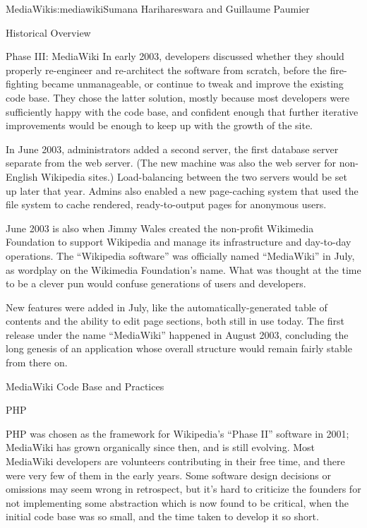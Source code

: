 \begin{aosachapter}{MediaWiki}{s:mediawiki}{Sumana Harihareswara and Guillaume Paumier}
\begin{aosasect1}{Historical Overview}
\begin{aosasect2}{Phase III: MediaWiki}
In early 2003, developers discussed whether they should properly
re-engineer and re-architect the software from scratch, before the
fire-fighting became unmanageable, or continue to tweak and improve
the existing code base. They chose the latter solution, mostly because
most developers were sufficiently happy with the code base, and
confident enough that further iterative improvements would be enough
to keep up with the growth of the site.

In June 2003, administrators added a second server, the first database
server separate from the web server. (The new machine was also the web
server for non-English Wikipedia sites.) Load-balancing between the
two servers would be set up later that year. Admins also enabled a new
page-caching system that used the file system to cache rendered,
ready-to-output pages for anonymous users.

June 2003 is also when Jimmy Wales created the non-profit Wikimedia 
Foundation
to support Wikipedia and manage its infrastructure and
day-to-day operations. The ``Wikipedia software'' was officially named
``MediaWiki'' in July, as wordplay on the Wikimedia Foundation's
name. What was thought at the time to be a clever pun would confuse
generations of users and developers.

New features were added in July, like the automatically-generated
table of contents and the ability to edit page sections, both still
in use today. The first release under the name ``MediaWiki'' happened in
August 2003, concluding the long genesis of an application whose
overall structure would remain fairly stable from there on.

\end{aosasect2}

\end{aosasect1}

\begin{aosasect1}{MediaWiki Code Base and Practices}

\begin{aosasect2}{PHP}

PHP was chosen as the framework for Wikipedia's ``Phase II'' software in
2001; MediaWiki has grown organically since then, and is still
evolving. Most MediaWiki developers are volunteers contributing in
their free time, and there were very few of them in the early years. Some
software design decisions or omissions may seem wrong in retrospect,
but it's hard to criticize the founders for not implementing some
abstraction which is now found to be critical, when the initial code
base was so small, and the time taken to develop it so short.


\end{aosasect2}
\end{aosasect1}
\end{aosachapter}
